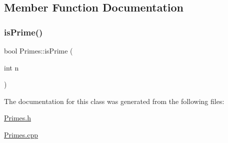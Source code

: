 \subsection{Member Function Documentation}
\mbox{\label{classPrimes_aee78865d4c4afb3f7d30f0209ac0a56d}} 
\subsubsection{\texorpdfstring{is\+Prime()}{isPrime()}}
{\footnotesize\ttfamily bool Primes\+::is\+Prime (\begin{DoxyParamCaption}\item[{int}]{n }\end{DoxyParamCaption})}



The documentation for this class was generated from the following files\+:\begin{DoxyCompactItemize}
\item 
\hyperlink{Primes_8h}{Primes.\+h}\item 
\hyperlink{Primes_8cpp}{Primes.\+cpp}\end{DoxyCompactItemize}
